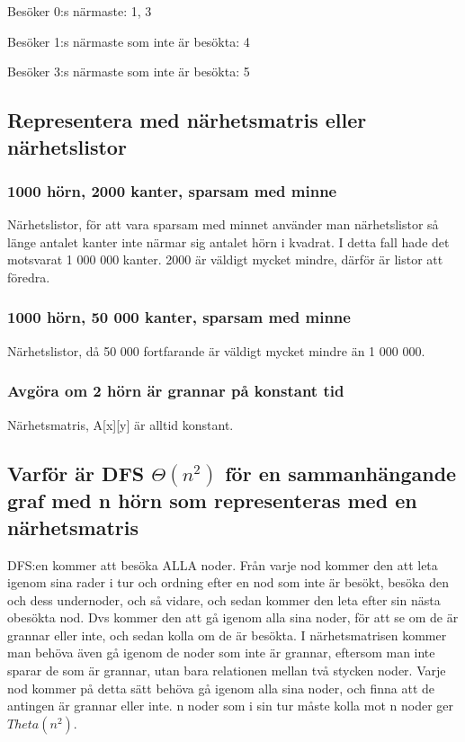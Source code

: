 \documentclass[a4paper,10pt,twoside]{article}
\begin{document}
Besöker 0:s närmaste: 1, 3

Besöker 1:s närmaste som inte är besökta: 4

Besöker 3:s närmaste som inte är besökta: 5

\subsection{Representera med närhetsmatris eller närhetslistor}

\subsubsection{1000 hörn, 2000 kanter, sparsam med minne}

Närhetslistor, för att vara sparsam med minnet använder man närhetslistor så länge antalet kanter inte närmar sig antalet hörn i kvadrat. I detta fall hade det motsvarat 1 000 000 kanter. 2000 är väldigt mycket mindre, därför är listor att föredra.

\subsubsection{1000 hörn, 50 000 kanter, sparsam med minne}

Närhetslistor, då 50 000 fortfarande är väldigt mycket mindre än 1 000 000.

\subsubsection{Avgöra om 2 hörn är grannar på konstant tid}

Närhetsmatris, A[x][y] är alltid konstant.

\subsection {Varför är DFS $\Theta(n^2)$ för en sammanhängande graf med n hörn som representeras med en närhetsmatris}

DFS:en kommer att besöka ALLA noder. Från varje nod kommer den att leta igenom sina rader i tur och ordning efter en nod som inte är besökt, besöka den och dess undernoder, och så vidare, och sedan kommer den leta efter sin nästa obesökta nod. Dvs kommer den att gå igenom alla sina noder, för att se om de är grannar eller inte, och sedan kolla om de är besökta. I närhetsmatrisen kommer man behöva även gå igenom de noder som inte är grannar, eftersom man inte sparar de som är grannar, utan bara relationen mellan två stycken noder. Varje nod kommer på detta sätt behöva gå igenom alla sina noder, och finna att de antingen är grannar eller inte. n noder som i sin tur måste kolla mot n noder ger $Theta(n^2)$.
\end{document}
